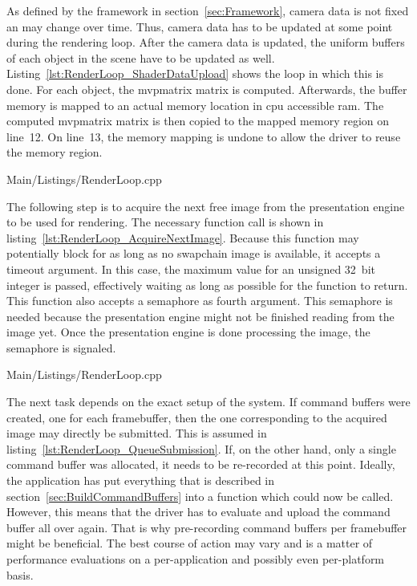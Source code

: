     As defined by the framework in section~\ref{sec:Framework}, camera data is not fixed an may change over time.
    Thus, camera data has to be updated at some point during the rendering loop.
    After the camera data is updated, the uniform buffers of each object in the scene have to be updated as well.
    Listing~\ref{lst:RenderLoop_ShaderDataUpload} shows the loop in which this is done.
    For each object, the \gls{mvpmatrix} matrix is computed.
    Afterwards, the buffer memory is mapped to an actual memory location in \gls{cpu} accessible \gls{ram}.
    The computed \gls{mvpmatrix} matrix is then copied to the mapped memory region on line~12.
    On line~13, the memory mapping is undone to allow the \gls{driver} to reuse the memory region.

    
    {Main/Listings/RenderLoop.cpp}

    The following step is to acquire the next free image from the presentation engine to be used for rendering.
    The necessary function call is shown in listing~\ref{lst:RenderLoop_AcquireNextImage}.
    Because this function may potentially block for as long as no swapchain image is available, it accepts a timeout argument.
    In this case, the maximum value for an unsigned 32~bit integer is passed, effectively waiting as long as possible for the function to return.
    This function also accepts a semaphore as fourth argument.
    This semaphore is needed because the presentation engine might not be finished reading from the image yet.
    Once the presentation engine is done processing the image, the semaphore is signaled.

    
    {Main/Listings/RenderLoop.cpp}

    The next task depends on the exact setup of the system.
    If command buffers were created, one for each framebuffer, then the one corresponding to the acquired image may directly be submitted.
    This is assumed in listing~\ref{lst:RenderLoop_QueueSubmission}.
    If, on the other hand, only a single command buffer was allocated, it needs to be re-recorded at this point.
    Ideally, the application has put everything that is described in section~\ref{sec:BuildCommandBuffers} into a function which could now be called.
    However, this means that the \gls{driver} has to evaluate and upload the command buffer all over again.
    That is why pre-recording command buffers per framebuffer might be beneficial.
    The best course of action may vary and is a matter of performance evaluations on a per-application and possibly even per-platform basis.

